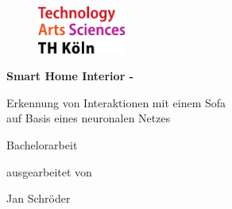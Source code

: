 \begin{titlepage}

\begin{center}

\begin{figure}[!ht]
		\includegraphics[width=0.26\textwidth]{images/THlogoheader.pdf}
\end{figure}

\vspace{0.4cm}

\begin{rmfamily}
\begin{huge}
\textbf{Smart Home Interior - }\\	
\end{huge}
\vspace{0.5cm}
\begin{LARGE}
 Erkennung von Interaktionen mit einem Sofa\\ auf Basis eines neuronalen Netzes\\
\end{LARGE}
\end{rmfamily}

\vspace{0.8cm}



\begin{LARGE}
\begin{scshape}
Bachelorarbeit\\[0.8em]
\end{scshape}
\end{LARGE}

\begin{large}
ausgearbeitet von\\ 
\vspace{0.3cm}
\begin{LARGE}
Jan Schröder\\
\end{LARGE}
\end{large}


\end{center}
\end{titlepage}
